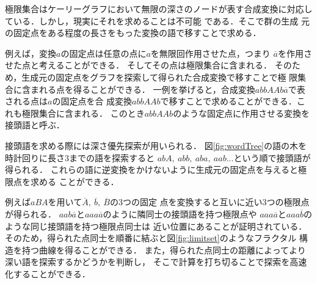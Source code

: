 極限集合はケーリーグラフにおいて無限の深さのノードが表す合成変換に対応し
ている．しかし，現実にそれを求めることは不可能 である．そこで群の生成
元の固定点をある程度の長さをもった変換の語で移すことで求める．

例えば，変換$a$の固定点は任意の点に$a$を無限回作用させた点，つまり
$\overline{a}$を作用させた点と考えることができる．
そしてその点は極限集合に含まれる．
そのため，生成元の固定点をグラフを探索して得られた合成変換で移すことで極
限集合に含まれる点を得ることができる．
一例を挙げると，合成変換$abbAAb\overline{a}$で表される点は$a$の固定点を合
成変換$abbAAb$で移すことで求めることができる．これも極限集合に含まれる．
このとき$abbAAb$のような固定点に作用させる変換を接頭語と呼ぶ．

接頭語を求める際には深さ優先探索が用いられる．
図\ref{fig:wordTree}の語の木を時計回りに長さ3までの語を探索すると
$abA,~abb,~aba,~aab ...$という順で接頭語が得られる．
これらの語に逆変換をかけないように生成元の固定点を与えると極限点を求める
ことができる．

例えば$aBA$を用いて$\overline{A},~\overline{b},~\overline{B}$の3つの固定
点を変換すると互いに近い3つの極限点が得られる．
$aab\overline{a}$と$aaa\overline{a}$のように隣同士の接頭語を持つ極限点や
$aaa\overline{a}$と$aaa\overline{b}$のような同じ接頭語を持つ極限点同士は
近い位置にあることが証明されている．
そのため，得られた点同士を順番に結ぶと図\ref{fig:limitset}のようなフラクタル
構造を持つ曲線を得ることができる．
また，得られた点同士の距離によってより深い語を探索するかどうかを判断し，
そこで計算を打ち切ることで探索を高速化することができる．

